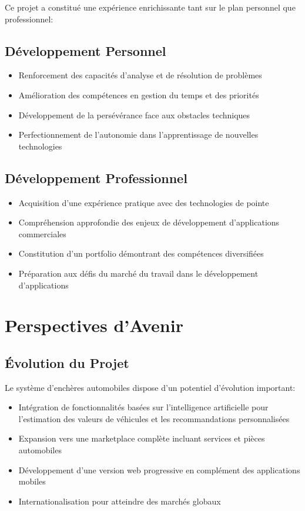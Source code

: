 Ce projet a constitué une expérience enrichissante tant sur le plan personnel que professionnel:

\subsection{Développement Personnel}

\begin{itemize}
    \item Renforcement des capacités d'analyse et de résolution de problèmes
    \item Amélioration des compétences en gestion du temps et des priorités
    \item Développement de la persévérance face aux obstacles techniques
    \item Perfectionnement de l'autonomie dans l'apprentissage de nouvelles technologies
\end{itemize}

\subsection{Développement Professionnel}

\begin{itemize}
    \item Acquisition d'une expérience pratique avec des technologies de pointe
    \item Compréhension approfondie des enjeux de développement d'applications commerciales
    \item Constitution d'un portfolio démontrant des compétences diversifiées
    \item Préparation aux défis du marché du travail dans le développement d'applications
\end{itemize}

\section{Perspectives d'Avenir}

\subsection{Évolution du Projet}

Le système d'enchères automobiles dispose d'un potentiel d'évolution important:

\begin{itemize}
    \item Intégration de fonctionnalités basées sur l'intelligence artificielle pour l'estimation des valeurs de véhicules et les recommandations personnalisées
    \item Expansion vers une marketplace complète incluant services et pièces automobiles
    \item Développement d'une version web progressive en complément des applications mobiles
    \item Internationalisation pour atteindre des marchés globaux
\end{itemize}

